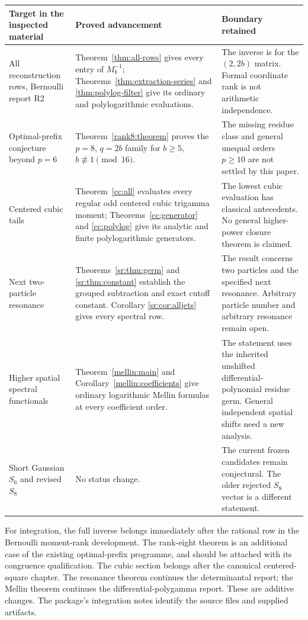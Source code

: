 \begin{longtable}{@{}>{\raggedright\arraybackslash}p{}>{\raggedright\arraybackslash}p{}>{\raggedright\arraybackslash}p{}@{}}
\toprule
Target in the inspected material & Proved advancement & Boundary retained\\
\midrule
\endhead
All reconstruction rows, Bernoulli report R2 &
Theorem~\ref{thm:all-rows} gives every entry of $M_b^{-1}$;
Theorems~\ref{thm:extraction-series} and \ref{thm:polylog-filter}
give its ordinary and polylogarithmic evaluations. &
The inverse is for the $(2,2b)$ matrix. Formal coordinate rank is
not arithmetic independence.\\[.5em]
Optimal-prefix conjecture beyond $p=6$ &
Theorem~\ref{rank8:theorem} proves the $p=8$, $q=2b$ family
for $b\ge5$, $b\not\equiv1\pmod {16}$. &
The missing residue class and general unequal orders $p\ge10$
are not settled by this paper.\\[.5em]
Centered cubic tails &
Theorem~\ref{cc:all} evaluates every regular odd centered cubic
trigamma moment; Theorems~\ref{cc:generator} and \ref{cc:polylog}
give its analytic and finite polylogarithmic generators. &
The lowest cubic evaluation has classical antecedents.
No general higher-power closure theorem is claimed.\\[.5em]
Next two-particle resonance &
Theorems~\ref{sr:thm:germ} and \ref{sr:thm:constant} establish
the grouped subtraction and exact cutoff constant. Corollary
\ref{sr:cor:alljets} gives every spectral row. &
The result concerns two particles and the specified next resonance.
Arbitrary particle number and arbitrary resonance remain open.\\[.5em]
Higher spatial spectral functionals &
Theorem~\ref{mellin:main} and Corollary~\ref{mellin:coefficients}
give ordinary logarithmic Mellin formulas at every coefficient order. &
The statement uses the inherited unshifted differential-polynomial
residue germ. General independent spatial shifts need a new analysis.\\[.5em]
Short Gaussian $S_6$ and revised $S_8$ &
No status change. &
The current frozen candidates remain conjectural. The older rejected
$S_8$ vector is a different statement.\\
\bottomrule
\end{longtable}

For integration, the full inverse belongs immediately after the rational
row in the Bernoulli moment-rank development. The rank-eight theorem is
an additional case of the existing optimal-prefix programme, and should
be attached with its congruence qualification. The cubic section belongs
after the canonical centered-square chapter. The resonance theorem
continues the determinantal report; the Mellin theorem continues the
differential-polygamma report. These are additive changes. The package's
integration notes identify the source files and supplied artifacts.

